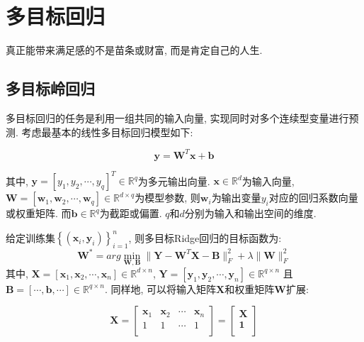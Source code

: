 \documentclass[lang=cn,10pt]{gorgeousnbook}
\numberwithin{equation}{section}%
\numberwithin{figure}{section}%
\begin{document}
\chapter{多目标回归}
\vspace{0.5in}
\begin{center}
    \textcolor[RGB]{255, 0, 0}{\faHeart}真正能带来满足感的不是苗条或财富, 而是肯定自己的人生.\textcolor[RGB]{255, 0, 0}{\faHeart}
\end{center}

\begin{center}
\end{center}
\section{多目标岭回归}
多目标回归的任务是利用一组共同的输入向量, 实现同时对多个连续型变量进行预测. 考虑最基本的线性多目标回归模型如下:

 \begin{equation}
\mathbf{y}=\mathbf{W}^T\mathbf{x}+\mathbf{b}
\end{equation}

其中, $\mathbf{y}=\left[ y_1,y_2,\cdots ,y_q \right] ^T\in \mathbb{R}^q$为多元输出向量. $\mathbf{x}\in\mathbb{R}^d$为输入向量, $\mathbf{W}=\left[ \mathbf{w}_1,\mathbf{w}_2,\cdots ,\mathbf{w}_q \right] \in \mathbb{R}^{d\times q}$为模型参数, 则$\mathbf{w}_i$为输出变量$y_i$对应的回归系数向量或权重矩阵.  而$\mathbf{b}\in \mathbb{R}^{q}$为截距或偏置. $q$和$d$分别为输入和输出空间的维度.

给定训练集$\left\{ \left( \mathbf{x}_i,\mathbf{y}_i \right) \right\} _{i=1}^{n}$, 则多目标Ridge回归的目标函数为:
 \begin{equation}
\mathbf{W}^*=arg\min_{\mathbf{W, B}}\lVert \mathbf{Y}-\mathbf{W}^T\mathbf{X}-\mathbf{B} \rVert _{F}^{2}+\lambda \lVert \mathbf{W} \rVert _{F}^{2}
\end{equation}
其中, $\mathbf{X}=\left[ \mathbf{x}_1,\mathbf{x}_2,\cdots ,\mathbf{x}_n \right]\in\mathbb{R}^{d\times n} $, $\mathbf{Y}=\left[ \mathbf{y}_1,\mathbf{y}_2,\cdots ,\mathbf{y}_n \right] \in\mathbb{R}^{q\times n} $ 且 $\mathbf{B}=\left[ \cdots ,\mathbf{b,}\cdots \right] \in \mathbb{R}^{q\times n}$. 同样地, 可以将输入矩阵$\mathbf{X}$和权重矩阵$\mathbf{W}$扩展:

 \begin{equation}
\mathbf{X} =\left[ \begin{matrix}
	\mathbf{x}_{1}&	\mathbf{x}_{2}& \cdots& \mathbf{x}_{n}\\
	1&		1& \cdots& 1\\
\end{matrix} \right]  =\left[ \begin{array}{c}
	\mathbf{X}\\
	\mathbf{1}\\
\end{array} \right] \nonumber
\end{equation}
\end{document}
